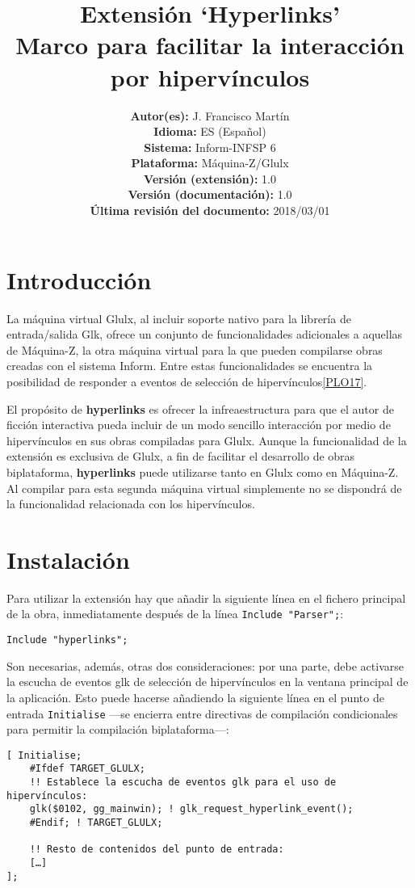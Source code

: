 \documentclass[a4paper,12pt]{article}
\title{\vspace{-3cm}Extensión `Hyperlinks'\\
    \Large{Marco para facilitar la interacción por hipervínculos}}
\author{
	\small{\textbf{Autor(es):} J. Francisco Martín}\\
	\small{\textbf{Idioma:} ES (Español)}\\
	\small{\textbf{Sistema:} Inform-INFSP 6}\\
	\small{\textbf{Plataforma:} Máquina-Z/Glulx}\\
	\small{\textbf{Versión (extensión):} 1.0}\\
	\small{\textbf{Versión (documentación):} 1.0}\\
	\small{\textbf{Última revisión del documento:} 2018/03/01}
}
\date{}
\numberwithin{equation}{section}
\begin{document}
\maketitle


\section{Introducción} \label{sec:introduccion}

La máquina virtual Glulx, al incluir soporte nativo para la librería de entrada/salida Glk, ofrece un conjunto de funcionalidades adicionales a aquellas de Máquina-Z, la otra máquina virtual para la que pueden compilarse obras creadas con el sistema Inform. Entre estas funcionalidades se encuentra la posibilidad de responder a eventos de selección de hipervínculos\ref{PLO17}.

El propósito de \textbf{hyperlinks} es ofrecer la infreaestructura para que el autor de ficción interactiva pueda incluir de un modo sencillo interacción por medio de hipervínculos en sus obras compiladas para Glulx. Aunque la funcionalidad de la extensión es exclusiva de Glulx, a fin de facilitar el desarrollo de obras biplataforma, \textbf{hyperlinks} puede utilizarse tanto en Glulx como en Máquina-Z. Al compilar para esta segunda máquina virtual simplemente no se dispondrá de la funcionalidad relacionada con los hipervínculos.


\section{Instalación} \label{sec:instalacion}

Para utilizar la extensión hay que añadir la siguiente línea en el fichero principal de la obra, inmediatamente después de la línea \verb|Include "Parser";|:

\begin{verbatim}
Include "hyperlinks";
\end{verbatim}

Son necesarias, además, otras dos consideraciones: por una parte, debe activarse la escucha de eventos glk de selección de hipervínculos en la ventana principal de la aplicación. Esto puede hacerse añadiendo la siguiente línea en el punto de entrada \verb|Initialise| ---se encierra entre directivas de compilación condicionales para permitir la compilación biplataforma---:

\begin{verbatim}
[ Initialise;
	#Ifdef TARGET_GLULX;
	!! Establece la escucha de eventos glk para el uso de hipervínculos:
	glk($0102, gg_mainwin); ! glk_request_hyperlink_event();
	#Endif; ! TARGET_GLULX;

	!! Resto de contenidos del punto de entrada:
	[…]
];
\end{verbatim}
\end{document}
